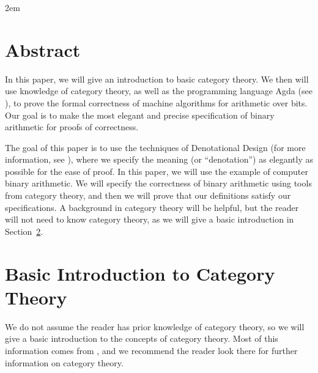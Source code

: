 \documentclass[14pt]{extarticle}  %
\theoremstyle{plain}
\theoremstyle{definition}
\theoremstyle{remark}
\begin{document}

\maketitle
\mathindent2em


\tableofcontents
\section{Abstract}
In this paper, we will give an introduction to basic category theory. We then will use knowledge of category theory, as well as the programming language Agda (see \cite{agda}), to
prove the formal correctness of machine algorithms for arithmetic over bits. Our goal is to make the most elegant and precise specification of binary arithmetic for proofs of correctness.

The goal of this paper is to use the techniques of Denotational Design (for more information, see \cite{conal}), where we specify the meaning (or ``denotation'')
as elegantly as possible for the ease of proof. In this paper, we will use the example of computer binary arithmetic. We will specify the correctness of binary arithmetic
using tools from category theory, and then we will prove that our definitions satisfy our specifications. A background in category theory will be helpful, but the reader
will not need to know category theory, as we will give a basic introduction in Section~\ref{sec:cat}.

\section{Basic Introduction to Category Theory}\label{sec:cat}
We do not assume the reader has prior knowledge of category theory, so we will give a basic introduction to the concepts of category theory.
Most of this information comes from \cite{cats}, and we recommend the reader look there for further information on category theory.
\end{document}
